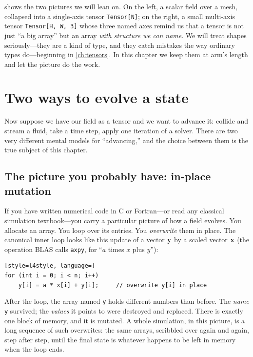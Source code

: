  shows the two pictures we will lean on. On the left, a
scalar field over a mesh, collapsed into a single-axis tensor
\lstinline[style=l4style]|Tensor[N]|; on the right, a small multi-axis tensor
\lstinline[style=l4style]|Tensor[H, W, 3]| whose three named axes remind us that
a tensor is not just ``a big array'' but an array \emph{with structure we can
name}. We will treat shapes seriously---they are a kind of type, and they catch
mistakes the way ordinary types do---beginning in \cref{ch:tensors}. In this
chapter we keep them at arm's length and let the picture do the work.

\section{Two ways to evolve a state}

Now suppose we have our field as a tensor and we want to advance it: collide and
stream a fluid, take a time step, apply one iteration of a solver. There are two
very different mental models for ``advancing,'' and the choice between them is the
true subject of this chapter.

\subsection{The picture you probably have: in-place mutation}

If you have written numerical code in C or Fortran---or read any classical
simulation textbook---you carry a particular picture of how a field evolves. You
allocate an array. You loop over its entries. You \emph{overwrite} them in place.
The canonical inner loop looks like this update of a vector $\mathbf{y}$ by a scaled
vector $\mathbf{x}$ (the operation BLAS calls \texttt{axpy}, for ``$a$ times $x$ plus
$y$''):

\begin{lstlisting}[style=l4style, language=]
for (int i = 0; i < n; i++)
    y[i] = a * x[i] + y[i];     // overwrite y[i] in place
\end{lstlisting}

\noindent After the loop, the array named \texttt{y} holds different numbers than
before. The \emph{name} \texttt{y} survived; the \emph{values} it points to were
destroyed and replaced. There is exactly one block of memory, and it is mutated.
A whole simulation, in this picture, is a long sequence of such overwrites: the
same arrays, scribbled over again and again, step after step, until the final
state is whatever happens to be left in memory when the loop ends.

